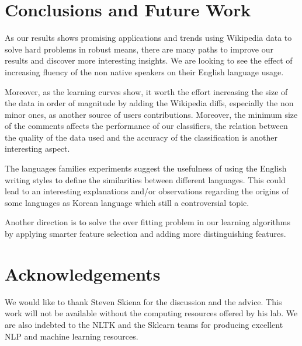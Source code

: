 \documentclass[11pt]{article}
\begin{document}
\section{Conclusions and Future Work}
As our results shows promising applications and trends using Wikipedia data to solve hard problems in robust means, there are many paths to improve our results and discover more interesting insights. We are looking to see the effect of increasing fluency of the non native speakers on their English language usage.

Moreover, as the learning curves show, it worth the effort increasing the size of the data in order of magnitude by adding the Wikipedia diffs, especially the non minor ones, as another source of users contributions. Moreover, the minimum size of the comments affects the performance of our classifiers, the relation between the quality of the data used and the accuracy of the classification is another interesting aspect.

The languages families experiments suggest the usefulness of using the English writing styles to define the similarities between different languages. This could lead to an interesting explanations and/or observations regarding the origins of some languages as Korean language which still a controversial topic.

Another direction is to solve the over fitting problem in our learning algorithms by applying smarter feature selection and adding more distinguishing features.

\section*{Acknowledgements}
We would like to thank Steven Skiena for the discussion and the advice. This work will not be available without the computing resources offered by his lab. We are also indebted to the NLTK and the Sklearn teams for producing excellent NLP and machine learning resources.

{}

\end{document}
